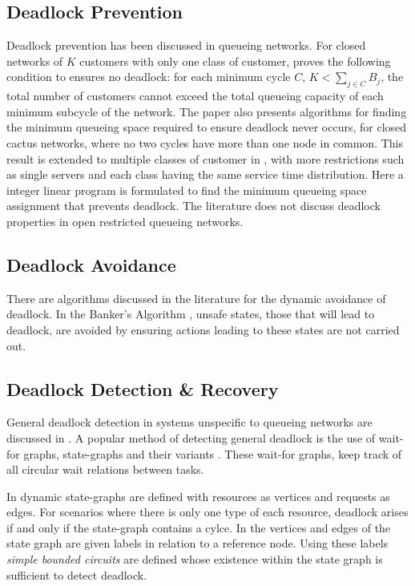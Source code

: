 \documentclass{article}
\begin{document}
\subsection{Deadlock Prevention}

Deadlock prevention has been discussed in queueing networks.
For closed networks of $K$ customers with only one class of customer, \cite{kunduakyildiz89} proves the following condition to ensures no deadlock: for each minimum cycle $C$, $K < \sum_{j\in C} B_j$, the total number of customers cannot exceed the total queueing capacity of each minimum subcycle of the network.
The paper also presents algorithms for finding the minimum queueing space required to ensure deadlock never occurs, for closed cactus networks, where no two cycles have more than one node in common.
This result is extended to multiple classes of customer in \cite{liebeherrakyildiz95}, with more restrictions such as single servers and each class having the same service time distribution.
Here a integer linear program is formulated to find the minimum queueing space assignment that prevents deadlock.
The literature does not discuss deadlock properties in open restricted queueing networks.

\subsection{Deadlock Avoidance}

There are algorithms discussed in the literature for the dynamic avoidance of deadlock.
In the Banker's Algorithm \cite{dijkstra82, kawadkaretal14}, unsafe states, those that will lead to deadlock, are avoided by ensuring actions leading to these states are not carried out.

\subsection{Deadlock Detection \& Recovery}

General deadlock detection in systems unspecific to queueing networks are discussed in \cite{coffmanelphick71}.
A popular method of detecting general deadlock is the use of wait-for graphs, state-graphs and their variants \cite{cheng90, elmagarmid86, coffmanelphick71, choetal95}.
These wait-for graphs, keep track of all circular wait relations between tasks.

In \cite{coffmanelphick71} dynamic state-graphs are defined with resources as vertices and requests as edges.
For scenarios where there is only one type of each resource, deadlock arises if and only if the state-graph contains a cylce.
In \cite{choetal95} the vertices and edges of the state graph are given labels in relation to a reference node.
Using these labels \textit{simple bounded circuits} are defined whose existence within the state graph is sufficient to detect deadlock.
\end{document}
